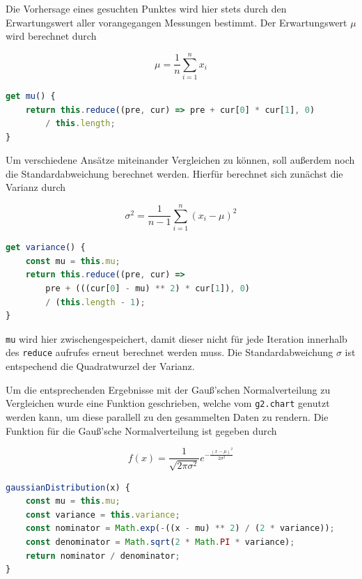 Die Vorhersage eines gesuchten Punktes wird hier stets durch den Erwartungswert aller vorangegangen Messungen bestimmt.
Der Erwartungswert $\mu$ wird berechnet durch~\cite[S.~143]{KlausEden2014}

\begin{equation}
    \mu = \frac{1}{n} \sum_{i=1}^n{x_i}
\end{equation}

\begin{lstlisting}[language=JavaScript, caption={Definition der \lstinline{mu} Funktion, welche den Erwartungswert der Daten in \lstinline{Data} berechnet.},label={lst:data_mu}]
get mu() {
    return this.reduce((pre, cur) => pre + cur[0] * cur[1], 0)
        / this.length;
}
\end{lstlisting}

Um verschiedene Ansätze miteinander Vergleichen zu können, soll au{\ss}erdem noch die Standardabweichung berechnet werden.
Hierfür berechnet sich zunächst die Varianz durch

\begin{equation}
    \sigma^2 = \frac{1}{n - 1} \sum_{i=1}^n(x_i - \mu)^2
\end{equation}

\begin{lstlisting}[language=JavaScript, caption={Definition der \lstinline{variance} Funktion, welche die Varianz der Daten in \lstinline{Data} berechnet}, label={lst:data_variance}]
get variance() {
    const mu = this.mu;
    return this.reduce((pre, cur) =>
        pre + (((cur[0] - mu) ** 2) * cur[1]), 0)
        / (this.length - 1);
}
\end{lstlisting}

\lstinline{mu} wird hier zwischengespeichert, damit dieser nicht für jede Iteration innerhalb des \lstinline{reduce} aufrufes erneut berechnet werden muss.
Die Standardabweichung $\sigma$ ist entspechend die Quadratwurzel der Varianz.

Um die entsprechenden Ergebnisse mit der Gau{\ss}'schen Normalverteilung zu Vergleichen wurde eine Funktion geschrieben, welche vom \lstinline{g2.chart} genutzt werden kann, um diese parallell zu den gesammelten Daten zu rendern.
Die Funktion für die Gau{\ss}'sche Normalverteilung ist gegeben durch

\begin{equation}
    f(x) = \frac{1}{\sqrt{2\pi\sigma^2}}e^{-\frac{(x-\mu)^2}{2\sigma^2}}
\end{equation}

\begin{lstlisting}[language=JavaScript, caption={Definition der \lstinline{gaussianDistribution} Funktion, welche die Normalverteilung für die gegebene Varianz und den Erwartungswert formt.}, label={lst:data_gauss}]
gaussianDistribution(x) {
    const mu = this.mu;
    const variance = this.variance;
    const nominator = Math.exp(-((x - mu) ** 2) / (2 * variance));
    const denominator = Math.sqrt(2 * Math.PI * variance);
    return nominator / denominator;
}
\end{lstlisting}

